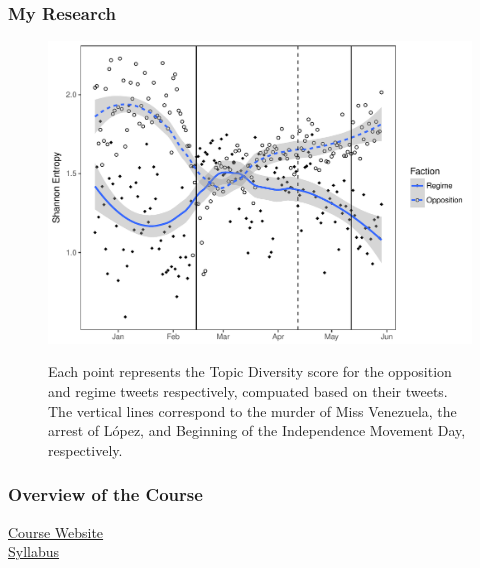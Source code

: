 \documentclass{beamer}
\begin{document}
\begin{frame}
	\frametitle{My Research}
		
		\begin{figure}
			
			
			\includegraphics[scale=.5]{figures/fig3.pdf} \\
			\raggedright{\small{Each point represents the Topic Diversity score for the opposition and regime tweets respectively, compuated based on their tweets. The vertical lines correspond to the murder of Miss Venezuela, the arrest of L\'{o}pez, and Beginning of the Independence Movement Day, respectively. }}
			
		\end{figure}
\end{frame}	


\begin{frame}
	\frametitle{Overview of the Course}
	
		\href{https://github.com/kmunger/Intro\_Data\_Science\_Rosario}{Course Website}\\
		
				\href{https://github.com/kmunger/Intro_Data_Science_Rosario/blob/master/syllabus.pdf}{Syllabus}\\
\end{frame}	
\end{document}
